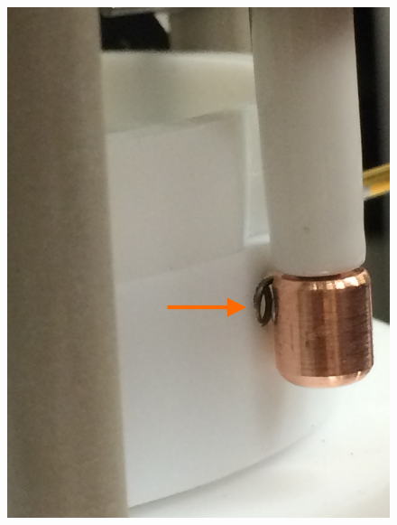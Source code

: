 \begin{figure}[htbp]
\begin{center}
\includegraphics[width=\halffig]{figures/testbed/ft2_1.jpg}

\end{center}
\end{figure}
